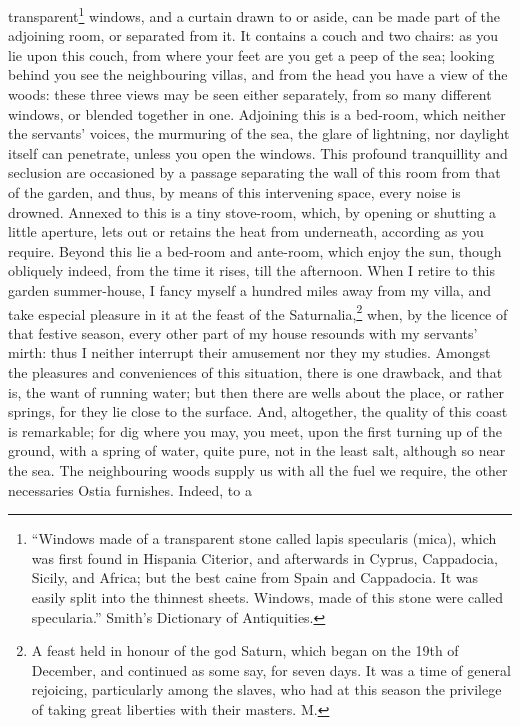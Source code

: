 transparent\footnote{``Windows made of a
transparent stone called lapis specularis (mica), which was first found in
Hispania Citerior, and afterwards in Cyprus, Cappadocia, Sicily, and
Africa; but the best caine from Spain and Cappadocia. It was easily split
into the thinnest sheets. Windows, made of this stone were called
specularia.'' Smith's Dictionary of Antiquities.}
windows, and a curtain drawn to or aside, can be made part of the
adjoining room, or separated from it. It contains a couch and two chairs:
as you lie upon this couch, from where your feet are you get a peep of the
sea; looking behind you see the neighbouring villas, and from the head you
have a view of the woods: these three views may be seen either separately,
from so many different windows, or blended together in one. Adjoining this
is a bed-room, which neither the servants' voices, the murmuring of the
sea, the glare of lightning, nor daylight itself can penetrate, unless you
open the windows. This profound tranquillity and seclusion are occasioned
by a passage separating the wall of this room from that of the garden, and
thus, by means of this intervening space, every noise is drowned. Annexed
to this is a tiny stove-room, which, by opening or shutting a little
aperture, lets out or retains the heat from underneath, according as you
require. Beyond this lie a bed-room and ante-room, which enjoy the sun,
though obliquely indeed, from the time it rises, till the afternoon. When
I retire to this garden summer-house, I fancy myself a hundred miles away
from my villa, and take especial pleasure in it at the feast of the
Saturnalia,\footnote{A feast held in honour of
the god Saturn, which began on the 19th of December, and continued as some
say, for seven days. It was a time of general rejoicing, particularly
among the slaves, who had at this season the privilege of taking great
liberties with their masters. M.}
when, by the licence of that festive season, every other part of my house
resounds with my servants' mirth: thus I neither interrupt their amusement
nor they my studies. Amongst the pleasures and conveniences of this
situation, there is one drawback, and that is, the want of running water;
but then there are wells about the place, or rather springs, for they lie
close to the surface. And, altogether, the quality of this coast is
remarkable; for dig where you may, you meet, upon the first turning up of
the ground, with a spring of water, quite pure, not in the least salt,
although so near the sea. The neighbouring woods supply us with all the
fuel we require, the other necessaries Ostia furnishes. Indeed, to a
